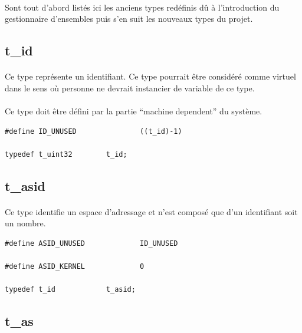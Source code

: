 \documentclass[10pt,a4wide]{article}
\begin{document}
\paragraph{}

Sont tout d'abord list\'es ici les anciens types red\'efinis d\^u
\`a l'introduction du gestionnaire d'ensembles puis s'en suit les nouveaux
types du projet.

\subsection{t\_id}

\paragraph{}

Ce type repr\'esente un identifiant. Ce type pourrait \^etre consid\'er\'e
comme virtuel dans le sens o\`u personne ne devrait instancier de variable
de ce type.

\paragraph{}

Ce type doit \^etre d\'efini par la partie ``machine dependent'' du syst\`eme.

\begin{verbatim}
#define ID_UNUSED               ((t_id)-1)

typedef t_uint32        t_id;
\end{verbatim}

\subsection{t\_asid}

\paragraph{}

Ce type identifie un espace d'adressage et n'est compos\'e que
d'un identifiant soit un nombre.

\begin{verbatim}
#define ASID_UNUSED             ID_UNUSED

#define ASID_KERNEL             0

typedef t_id            t_asid;
\end{verbatim}

\subsection{t\_as}
\end{document}
